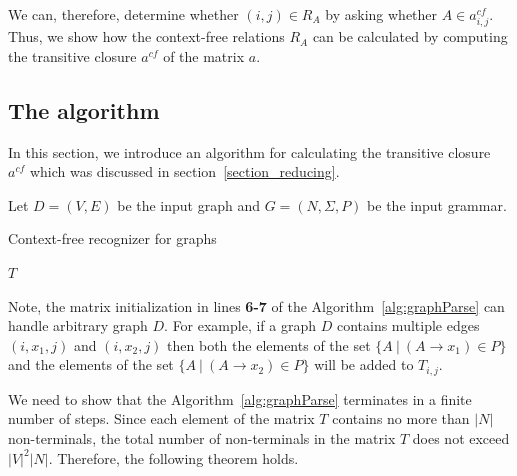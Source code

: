 We can, therefore, determine whether $(i,j) \in R_A$ by asking whether $A \in a^{cf}_{i,j}$. Thus, we show how the context-free relations $R_A$ can be calculated by computing the transitive closure $a^{cf}$ of the matrix $a$.



\subsection{The algorithm} \label{section_algorithm}
In this section, we introduce an algorithm for calculating the transitive closure $a^{cf}$ which was discussed in section~\ref{section_reducing}.

Let $D = (V, E)$ be the input graph and $G = (N,\Sigma,P)$ be the input grammar.

\begin{algorithm}[H]
\begin{algorithmic}[1]
\caption{Context-free recognizer for graphs}
\label{alg:graphParse}
    
    \EndFor    
       
    \EndWhile
\State \Return $T$
\EndFunction
\end{algorithmic}
\end{algorithm}

Note, the matrix initialization in lines \textbf{6-7} of the Algorithm~\ref{alg:graphParse} can handle arbitrary graph $D$. For example, if a graph $D$ contains multiple edges $(i,x_1,j)$ and $(i,x_2,j)$ then both the elements of the set $\{A~|~(A \rightarrow x_1) \in P \}$ and the elements of the set $\{A~|~(A \rightarrow x_2) \in P \}$ will be added to $T_{i,j}$.

We need to show that the Algorithm~\ref{alg:graphParse} terminates in a finite number of steps. Since each element of the matrix $T$ contains no more than $|N|$ non-terminals, the total number of non-terminals in the matrix $T$ does not exceed $|V|^2|N|$. Therefore, the following theorem holds.

